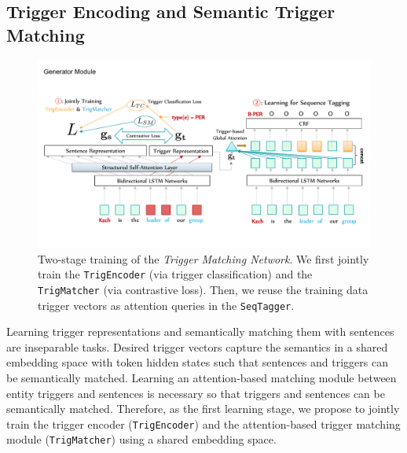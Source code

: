 \subsection{Trigger Encoding and Semantic Trigger Matching}
\label{sec:firststage}

\begin{figure}[h]  %
 	\centering 
	\includegraphics[width=0.85\linewidth]{LatexDiss/figures/tmn.pdf}
	\caption{Two-stage training of the \textit{Trigger Matching Network}. We first jointly train the {\texttt{TrigEncoder}} (via trigger classification) and the \texttt{TrigMatcher} (via contrastive loss). Then, we reuse the training data trigger vectors as attention queries in the \texttt{SeqTagger}.} 
	\label{fig:framework}
\end{figure}

Learning trigger representations and semantically matching them with sentences are inseparable tasks.
Desired trigger vectors capture the semantics in a shared embedding space with token hidden states such that sentences and triggers can be semantically matched.
Learning an attention-based matching module between entity triggers and sentences is necessary so that triggers and sentences can be semantically matched.
Therefore, as the first learning stage, we propose to jointly train the trigger encoder (\texttt{TrigEncoder}) and the attention-based trigger matching module (\texttt{TrigMatcher}) using a shared embedding space.

